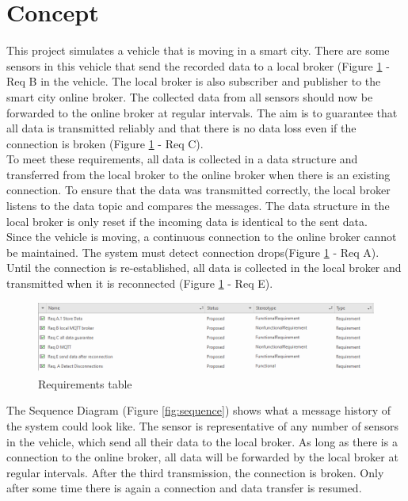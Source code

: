 \section{Concept}
\label{sec:3}

This project simulates a vehicle that is moving in a smart city. There are some sensors in this vehicle that send the recorded data to a local broker (Figure \ref{fig:req} - Req B in the vehicle. The local broker is also subscriber and publisher to the smart city online broker. The collected data from all sensors should now be forwarded to the online broker at regular intervals. The aim is to guarantee that all data is transmitted reliably and that there is no data loss even if the connection is broken (Figure \ref{fig:req} - Req C).\\


To meet these requirements, all data is collected in a data structure and transferred from the local broker to the online broker when there is an existing connection. To ensure that the data was transmitted correctly, the local broker listens to the data topic and compares the messages. The data structure in the local broker is only reset if the incoming data is identical to the sent data.\\


Since the vehicle is moving, a continuous connection to the online broker cannot be maintained. The system must detect connection drops(Figure \ref{fig:req} - Req A). Until the connection is re-established, all data is collected in the local broker and transmitted when it is reconnected (Figure \ref{fig:req} - Req E).\\

\begin{figure}
\sidecaption
\includegraphics[scale=.5]{images/images_michael/Requirements_list.PNG}
\caption{Requirements table}
\label{fig:req}
\end{figure}

The Sequence Diagram (Figure \ref{fig:sequence}) shows what a message history of the system could look like. The sensor is representative of any number of sensors in the vehicle, which send all their data to the local broker. As long as there is a connection to the online broker, all data will be forwarded by the local broker at regular intervals. After the third transmission, the connection is broken. Only after some time there is again a connection and data transfer is resumed.\\


